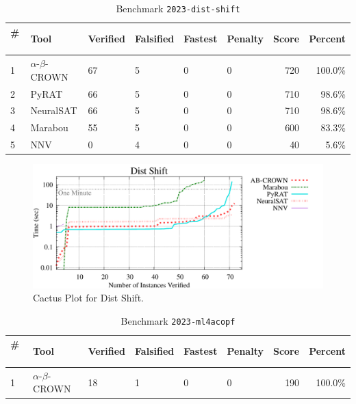 \begin{table}[h]
\begin{center}
\caption{Benchmark \texttt{2023-dist-shift}} \label{tab:cat_{cat}}
{\setlength{\tabcolsep}{2pt}
\begin{tabular}[h]{@{}llllllrr@{}}
\toprule
\textbf{\# ~} & \textbf{Tool} & \textbf{Verified} & \textbf{Falsified} & \textbf{Fastest} & \textbf{Penalty} & \textbf{Score} & \textbf{Percent}\\
\midrule
1 & $\alpha$-$\beta$-CROWN & 67 & 5 & 0 & 0 & 720 & 100.0\% \\
2 & PyRAT & 66 & 5 & 0 & 0 & 710 & 98.6\% \\
3 & NeuralSAT & 66 & 5 & 0 & 0 & 710 & 98.6\% \\
4 & Marabou & 55 & 5 & 0 & 0 & 600 & 83.3\% \\
5 & NNV & 0 & 4 & 0 & 0 & 40 & 5.6\% \\
\bottomrule
\end{tabular}
}
\end{center}
\end{table}



\begin{figure}[h]
\centerline{\includegraphics[width=\textwidth]{cactus/2023_dist_shift.pdf}}
\caption{Cactus Plot for Dist Shift.}
\label{fig:quantPic}
\end{figure}



\begin{table}[h]
\begin{center}
\caption{Benchmark \texttt{2023-ml4acopf}} \label{tab:cat_{cat}}
{\setlength{\tabcolsep}{2pt}
\begin{tabular}[h]{@{}llllllrr@{}}
\toprule
\textbf{\# ~} & \textbf{Tool} & \textbf{Verified} & \textbf{Falsified} & \textbf{Fastest} & \textbf{Penalty} & \textbf{Score} & \textbf{Percent}\\
\midrule
1 & $\alpha$-$\beta$-CROWN & 18 & 1 & 0 & 0 & 190 & 100.0\% \\
\bottomrule
\end{tabular}
}
\end{center}
\end{table}




